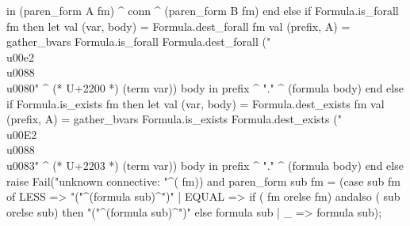        in (paren_form A fm) ^ conn ^ (paren_form B fm) end
  else if Formula.is_forall fm
  then let
    val (var, body) = Formula.dest_forall fm
    val (prefix, A) = gather_bvars Formula.is_forall
                                   Formula.dest_forall
                                   ("\\u00e2\\u0088\\u0080" ^ (* U+2200 *)
                                    (term var))
                                   body
  in prefix ^ "." ^ (formula body) end
  else if Formula.is_exists fm
  then let
    val (var, body) = Formula.dest_exists fm
    val (prefix, A) = gather_bvars Formula.is_exists
                                   Formula.dest_exists
                                   ("\\u00E2\\u0088\\u0083" ^ (* U+2203 *)
                                    (term var))
                                   body
  in prefix ^ "." ^ (formula body) end
  else raise Fail("unknown connective: "^( fm))
and paren_form sub fm =
    (case  sub fm of
      LESS => "("^(formula sub)^")"
    | EQUAL => if ( fm orelse  fm) andalso
                  ( sub orelse  sub)
               then "("^(formula sub)^")"
               else formula sub
    | _ => formula sub);
\eatline
